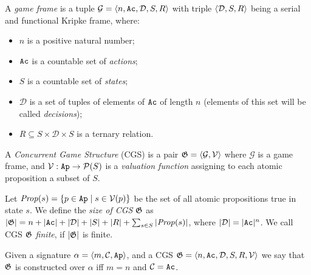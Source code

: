\documentclass[sigconf,anonymous]{aamas}
\begin{document}
\begin{definition}
    A \emph{game frame} is a tuple $\mathcal{G}=\langle n,\texttt{Ac}, \mathcal{D}, S,R  \rangle$ with triple $\langle \mathcal{D}, S, R \rangle$ being a serial and functional Kripke frame, where: 
    \begin{itemize}
        \item $n$ is a positive natural number; 
        \item $\texttt{Ac}$ is a countable set of \emph{actions}; 
        \item $S$ is a countable  set of \emph{states}; 
        \item $\mathcal{D}$ is a set of tuples of elements of $\texttt{Ac}$ of length $n$ (elements of this set will be called \emph{decisions}); 
        \item $R\subseteq S \times \mathcal{D}\times S$ is a ternary relation. 
    \end{itemize}   
    A \emph{Concurrent Game Structure} (CGS) is a pair $\mathfrak{G}=\langle \mathcal{G},\mathcal{V} \rangle$ where $\mathcal{G}$ is a game frame, and $\mathcal{V}: \texttt{Ap} \to \mathcal{P}(S)$ is a \emph{valuation function} assigning to each atomic proposition a subset of $S$. %

    Let $\mathit{Prop} (s) = \{p \in \texttt{Ap} \mid s \in \mathcal{V}(p)\}$ be the set of all atomic propositions true in state $s$. We define the \emph{size of CGS} $\mathfrak{G}$ as $|\mathfrak{G}| = n + |\texttt{Ac}| + |\mathcal{D}| + |S| + |R| + \sum_{s \in S} |\mathit{Prop} (s)|$, where $|\mathcal{D}| = |\texttt{Ac}|^n$. We call CGS $\mathfrak{G}$ \emph{finite}, if $|\mathfrak{G}|$ is finite.
\end{definition}




    
     
 




\begin{definition}
    Given a signature $\alpha=\langle m,\mathcal{C},\texttt{Ap} \rangle$,  and  a CGS $\mathfrak{G}=\langle n,\texttt{Ac},\mathcal{D},S,R,\mathcal{V} \rangle$ we say that $\mathfrak{G}$ is constructed over $\alpha$ iff  $m=n$ and $\mathcal{C}=\texttt{Ac}$. 
 \end{definition}
\end{document}
